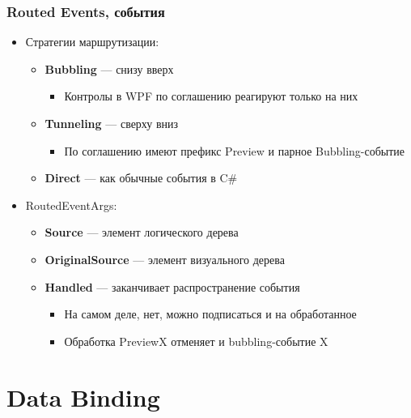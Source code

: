\documentclass[xetex,mathserif,serif]{beamer}
\begin{document}
    \begin{frame}
        \frametitle{Routed Events, события}
        \begin{itemize}
            \item Стратегии маршрутизации:
            \begin{itemize}
                \item \textbf{Bubbling} --- снизу вверх
                \begin{itemize}
                    \item Контролы в WPF по соглашению реагируют только на них
                \end{itemize}
                \item \textbf{Tunneling} --- сверху вниз
                \begin{itemize}
                    \item По соглашению имеют префикс Preview и парное Bubbling-событие
                \end{itemize}
                \item \textbf{Direct} --- как обычные события в C\#
            \end{itemize}
            \item RoutedEventArgs:
            \begin{itemize}
                \item \textbf{Source} --- элемент логического дерева
                \item \textbf{OriginalSource} --- элемент визуального дерева
                \item \textbf{Handled} --- заканчивает распространение события
                \begin{itemize}
                    \item На самом деле, нет, можно подписаться и на обработанное
                    \item Обработка PreviewX отменяет и bubbling-событие X
                \end{itemize}
            \end{itemize}
        \end{itemize}
    \end{frame}

    \section{Data Binding}
\end{document}
